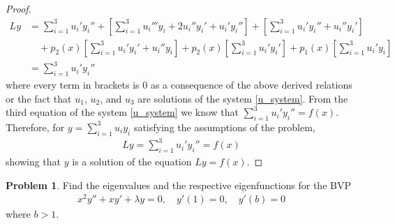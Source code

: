 \documentclass[12pt]{article}
\theoremstyle{definition}
\newtheorem{problem}{Problem}
\begin{document}
\begin{proof}
\begin{align*}
    Ly &= \sum_{i=1}^3 u_i' y_i'' + \left[\sum_{i=1}^{3}u_i'''y_i + 2u_i''y_i' + u_i'y_i''\right] + \left[\sum_{i=1}^{3}u_i'y_i'' + u_i''y_i'\right] \\
    &\quad + p_2(x)\left[\sum_{i=1}^{3}u_i'y_i' + u_i''y_i\right] + p_2(x)\left[\sum_{i=1}^{3}u_i'y_i'\right] + p_1(x)\left[\sum_{i=1}^{3}u_i'y_i\right] \\
    &= \sum_{i=1}^3 u_i' y_i''
  \end{align*}
  where every term in brackets is 0 as a consequence of the above derived relations or
  the fact that $u_1$, $u_2$, and $u_3$ are solutions of the system \eqref{u_system}.
  From the third equation of the system \eqref{u_system} we know that $\sum_{i=1}^3 u_i' y_i'' = f(x)$.
  Therefore, for $y = \sum_{i=1}^{3} u_i y_i$ satisfying the assumptions of the problem,
  \begin{align*}
    Ly = \sum_{i=1}^3 u_i' y_i'' = f(x)
  \end{align*}
  showing that $y$ is a solution of the equation $Ly = f(x)$.
\end{proof}
\newpage


\begin{problem}
  Find the eigenvalues and the respective eigenfunctions for the BVP
  \begin{align*}
    x^2y'' + xy' + \lambda y = 0, \quad y'(1) = 0, \quad y'(b) = 0
  \end{align*}
  where $b > 1$.
\end{problem}
\end{document}
